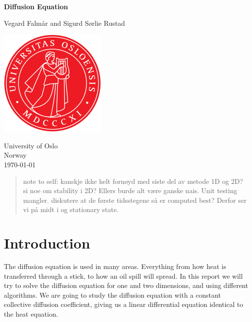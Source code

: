 \documentclass[reprint, english,notitlepage,nofootinbib]{revtex4-1}  %
\begin{document}
\begin{titlepage}
	\begin{center}
	\textbf{Diffusion Equation}

	\vspace{0.2cm}
	Vegard Falmår and Sigurd Sørlie Rustad

	\vspace{0.5cm}
	\includegraphics[scale=0.5]{../../pictures/UIO}
	\vspace{0.8cm}

	University of Oslo\\
	Norway\\
	\today	\\
	\end{center}
	\tableofcontents
	\clearpage
\end{titlepage}

\begin{abstract}
  note to self: kanskje ikke helt fornøyd med siste del av metode 1D og 2D? si noe om stability i 2D? Ellers burde alt være ganske nais. Unit testing mangler. diskutere at de første tidsstegene så er computed best? Derfor ser vi på midt i og stationary state.
\end{abstract}
\maketitle                              %


\section{Introduction}
The diffusion equation is used in many areas. Everything from how heat is transferred through a stick, to how an oil spill will spread. In this report we will try to solve the diffusion equation for one and two dimensions, and using different algorithms. We are going to study the diffusion equation with a constant collective diffusion coefficient, giving us a linear differential equation identical to the heat equation.
\end{document}
